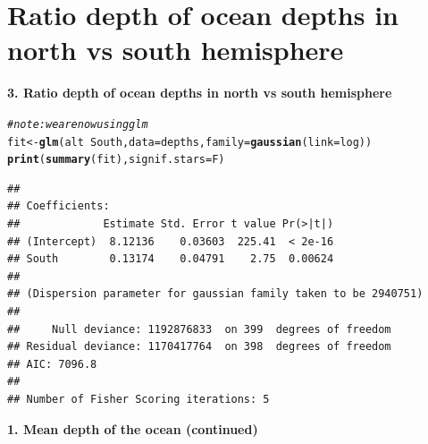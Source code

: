 \documentclass[10pt,handout]{beamer}\usepackage[]{graphicx}\usepackage[]{color}
\makeatletter
\newcommand{\hlcom}[1]{\textcolor[rgb]{0.678,0.584,0.686}{\textit{#1}}}%
\newcommand{\hlopt}[1]{\textcolor[rgb]{0,0,0}{#1}}%
\newcommand{\hlstd}[1]{\textcolor[rgb]{0.345,0.345,0.345}{#1}}%
\newcommand{\hlkwb}[1]{\textcolor[rgb]{0.69,0.353,0.396}{#1}}%
\newcommand{\hlkwc}[1]{\textcolor[rgb]{0.333,0.667,0.333}{#1}}%
\newcommand{\hlkwd}[1]{\textcolor[rgb]{0.737,0.353,0.396}{\textbf{#1}}}%
\newenvironment{kframe}{%
 \def\at@end@of@kframe{}%
 \ifinner\ifhmode%
  \def\at@end@of@kframe{\end{minipage}}%
  \begin{minipage}{\columnwidth}%
 \fi\fi%
 \def\FrameCommand##1{\hskip\@totalleftmargin \hskip-\fboxsep
 \colorbox{shadecolor}{##1}\hskip-\fboxsep
     \hskip-\linewidth \hskip-\@totalleftmargin \hskip\columnwidth}%
 \MakeFramed {\advance\hsize-\width
   \@totalleftmargin\z@ \linewidth\hsize
   \@setminipage}}%
 {\par\unskip\endMakeFramed%
 \at@end@of@kframe}
\newenvironment{knitrout}{}{} %
\makeatother
\begin{document}
\section{Ratio depth of ocean depths in north vs south hemisphere}

\begin{frame}
\vspace*{-1.1in}
\textbf{3. Ratio depth of ocean depths in north vs south hemisphere}
\begin{knitrout}\tiny
{}\color{fgcolor}\begin{kframe}
\begin{alltt}
\hlcom{# note: we are now using glm}
\hlstd{fit} \hlkwb{<-} \hlkwd{glm}\hlstd{(alt} \hlopt{~} \hlstd{South,} \hlkwc{data} \hlstd{= depths,} \hlkwc{family} \hlstd{=} \hlkwd{gaussian}\hlstd{(}\hlkwc{link}\hlstd{=log))}
\hlkwd{print}\hlstd{(}\hlkwd{summary}\hlstd{(fit),} \hlkwc{signif.stars} \hlstd{= F)}
\end{alltt}
\begin{verbatim}
## 
## Coefficients:
##             Estimate Std. Error t value Pr(>|t|)
## (Intercept)  8.12136    0.03603  225.41  < 2e-16
## South        0.13174    0.04791    2.75  0.00624
## 
## (Dispersion parameter for gaussian family taken to be 2940751)
## 
##     Null deviance: 1192876833  on 399  degrees of freedom
## Residual deviance: 1170417764  on 398  degrees of freedom
## AIC: 7096.8
## 
## Number of Fisher Scoring iterations: 5
\end{verbatim}
\end{kframe}
\end{knitrout}

\end{frame}


\begin{frame}
	\vspace*{-5.0in}
	\textbf{1. Mean depth of the ocean (continued)}
	
\end{frame}
\end{document}
